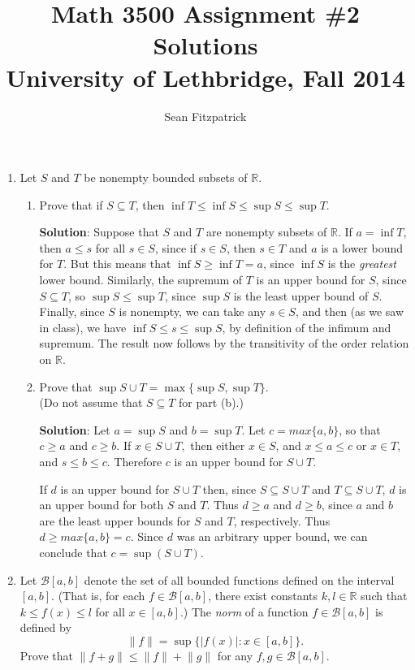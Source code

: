 \documentclass[letterpaper,12pt]{article}
\title{Math 3500 Assignment \#2 Solutions\\University of Lethbridge, Fall 2014}
\author{Sean Fitzpatrick}
\newcommand{\R}{\mathbb{R}}
\newcommand{\abs}[1]{\lvert #1\rvert}
\begin{document}
 \maketitle


\begin{enumerate}
 \item Let $S$ and $T$ be nonempty bounded subsets of $\R$. 
\begin{enumerate}
 \item Prove that if $S\subseteq T$, then $\inf T\leq \inf S\leq \sup S\leq \sup T$.

\bigskip

{\bf Solution}: Suppose that $S$ and $T$ are nonempty subsets of $\mathbb{R}$. If $a=\inf T$, then $a\leq s$ for all $s\in S$, since if $s\in S$, then $s\in T$ and $a$ is a lower bound for $T$. But this means that $\inf S\geq \inf T=a$, since $\inf S$ is the {\em greatest} lower bound. Similarly, the supremum of $T$ is an upper bound for $S$, since $S\subseteq T$, so $\sup S\leq \sup T$, since $\sup S$ is the least upper bound of $S$. Finally, since $S$ is nonempty, we can take any $s\in S$, and then (as we saw in class), we have $\inf S\leq s\leq \sup S$, by definition of the infimum and supremum. The result now follows by the transitivity of the order relation on $\mathbb{R}$.

 \item Prove that $\sup S\cup T = \max\{\sup S, \sup T\}$. \\(Do not assume that $S\subseteq T$ for part (b).)

\bigskip

{\bf Solution}: Let $a=\sup S$ and $b=\sup T$.
Let $c=max\{a,b\}$, so that $c \geq a$ and $c \geq b$.
If $x \in S \cup T,$ then 
 either $x \in S$, and $x \leq a \leq c$
 or $x \in T,$ and $s \leq b \leq c$.
Therefore $c$ is an upper bound for $S \cup T$.

If $d$ is an upper bound for $S \cup T$ then, since $S \subseteq S \cup T$ and $T \subseteq S \cup T$, $d$ is an upper bound for both $S$ and $T$. Thus $d \geq a$ and $d \geq b$, since $a$ and $b$ are the least upper bounds for $S$ and $T$, respectively. Thus $d\geq max\{a,b\} =c$. Since $d$ was an arbitrary upper bound, we can conclude that $c=\sup (S \cup T).$
\end{enumerate}
 \item Let $\mathcal{B}[a,b]$ denote the set of all bounded functions defined on the interval $[a,b]$. (That is, for each $f\in \mathcal{B}[a,b]$, there exist constants $k,l\in\R$ such that $k\leq f(x)\leq l$ for all $x\in [a,b]$.) The {\em norm} of a function $f\in \mathcal{B}[a,b]$ is defined by
\[
 \lVert f\rVert = \sup\{\abs{f(x)} : x\in [a,b]\}.
\]
Prove that $\lVert f+g\rVert \leq \lVert f\rVert +\lVert g\rVert$ for any $f,g\in\mathcal{B}[a,b]$.


\end{enumerate}
\end{document}
